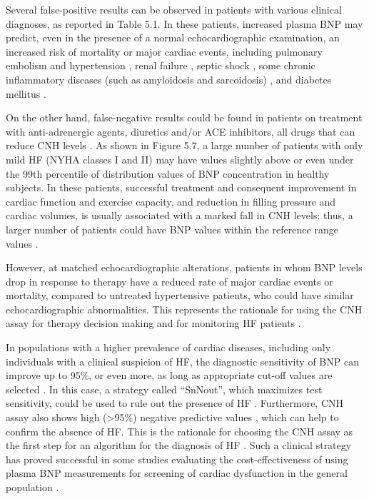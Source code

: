 \documentclass[14pt,a4paper,onecolumn]{extarticle}
\begin{document}
Several false-positive results can be observed in patients with various clinical diagnoses, as reported in Table 5.1. In these patients, increased plasma BNP may predict, even in the presence of a normal echocardiographic examination, an increased risk of mortality or major cardiac events, including pulmonary embolism \citep{bib380} \citep{bib381} \citep{bib382} and hypertension \citep{bib383}, renal failure \citep{bib384} \citep{bib385}, septic shock \citep{bib386}, some chronic inflammatory diseases (such as amyloidosis and sarcoidosis) \citep{bib387} \citep{bib388}, and diabetes mellitus \citep{bib389}.

On the other hand, false-negative results could be found in patients on treatment with anti-adrenergic agents, diuretics and/or ACE inhibitors, all drugs that can reduce CNH levels \citep{bib35}. As shown in Figure 5.7, a large number of patients with only mild HF (NYHA classes I and II) may have values slightly above or even under the 99th percentile of distribution values of BNP concentration in healthy subjects. In these patients, successful treatment and consequent improvement in cardiac function and exercise capacity, and reduction in filling pressure and cardiac volumes, is usually associated with a marked fall in CNH levels: thus, a larger number of patients could have BNP values within the reference range values \citep{bib35} \citep{bib390}.

However, at matched echocardiographic alterations, patients in whom BNP levels drop in response to therapy have a reduced rate of major cardiac events or mortality, compared to untreated hypertensive patients, who could have similar echocardiographic abnormalities. This represents the rationale for using the CNH assay for therapy decision making and for monitoring HF patients \citep{bib35} \citep{bib361} \citep{bib362} \citep{bib363} \citep{bib364} \citep{bib365}.

In populations with a higher prevalence of cardiac diseases, including only individuals with a clinical suspicion of HF, the diagnostic sensitivity of BNP can improve up to 95\%, or even more, as long as appropriate cut-off values are selected \citep{bib35} \citep{bib372}. In this case, a strategy called “SnNout”, which maximizes test sensitivity, could be used to rule out the presence of HF \citep{bib391}. Furthermore, CNH assay also shows high (>95\%) negative predictive values \citep{bib35} \citep{bib320}, which can help to confirm the absence of HF. This is the rationale for choosing the CNH assay as the first step for an algorithm for the diagnosis of HF \citep{bib369} \citep{bib370}. Such a clinical strategy has proved successful in some  studies evaluating the cost-effectiveness of using plasma BNP measurements for screening of cardiac dysfunction in the general population \citep{bib392} \citep{bib393} \citep{bib394}.
\end{document}
